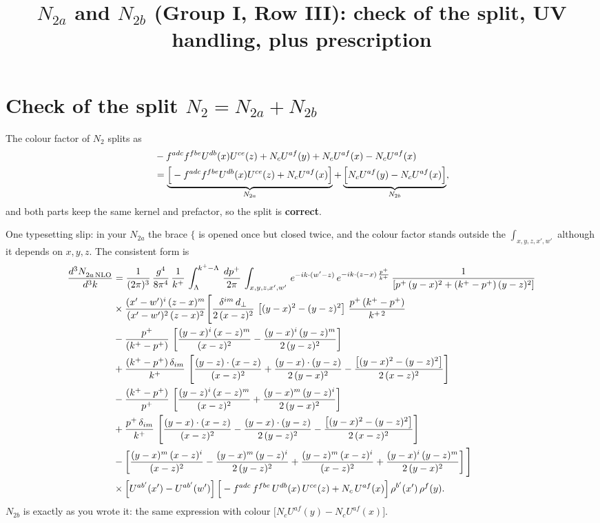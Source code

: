 \documentclass[10pt]{article}
\title{$N_{2a}$ and $N_{2b}$ (Group I, Row III): check of the split, UV handling, plus prescription}
\date{}
\numberwithin{equation}{section}
\begin{document}
\maketitle

\section{Check of the split $N_{2}=N_{2a}+N_{2b}$}
The colour factor of $N_{2}$ splits as
\begin{align}
&-f^{adc}f^{fbe}U^{db}(x)U^{ce}(z)+N_{c}U^{af}(y)+N_{c}U^{af}(x)-N_{c}U^{af}(x)\notag\\
&=\underbrace{\Big[-f^{adc}f^{fbe}U^{db}(x)U^{ce}(z)+N_{c}U^{af}(x)\Big]}_{N_{2a}}+\underbrace{\Big[N_{c}U^{af}(y)-N_{c}U^{af}(x)\Big]}_{N_{2b}},
\end{align}
and both parts keep the same kernel and prefactor, so the split is \textbf{correct}.

One typesetting slip: in your $N_{2a}$ the brace $\Bigg\{$ is opened once but closed twice, and the colour factor stands outside the $\int_{x,y,z,x',w'}$ although it depends on $x,y,z$. The consistent form is
\begin{align}
    \frac{d^{3}N_{2a\,\rm NLO}^{\rm}}{d^{3}k}  & =  \frac{1}{(2\pi)^{3}}\, \frac{g^{4}}{8\pi^{4}}\,\frac{1}{k^{+}}\,\int_{\Lambda}^{k^{+}-\Lambda}\, \frac{dp^{+}}{2\pi} \, \int_{x,y,z,x',w'}\,e^{-ik\cdot(w'-z)}\,e^{-ik\cdot (z-x)\,\frac{p^{+}}{k^{+}}}\,\frac{1}{\left[p^{+}\,(y-x)^{2}+(k^{+}-p^{+})\,(y-z)^{2}\right]} \notag \\ & \times\frac{(x'-w')^{i}\,(z-x)^{m}}{(x'-w')^{2}\,(z-x)^{2}}\Bigg[\frac{\delta^{im}\,d_{\perp}}{2\,(x-z)^{2}}\,\left[(y-x)^{2}-(y-z)^{2}\right]\,\frac{p^{+}\,(k^{+}-p^{+})}{k^{+\,2}}\notag\\ &-\frac{p^{+}}{(k^{+}-p^{+})}\,\left[\frac{(y-x)^{i}\,(x-z)^{m}}{(x-z)^{2}}-\frac{(y-x)^{i}\,(y-z)^{m}}{2\,(y-z)^{2}}\right]\notag \\ & +\frac{(k^{+}-p^{+})\,\delta_{im}}{k^{+}}\,\left[\frac{(y-z)\cdot (x-z)}{(x-z)^{2}}+\frac{(y-x)\cdot (y-z)}{2\,(y-x)^{2}}-\frac{\left[(y-x)^{2}-(y-z)^{2}\right]}{2\,(x-z)^{2}}\right]\notag\\ & -\frac{(k^{+}-p^{+})}{p^{+}}\,\left[\frac{(y-z)^{i}\,(x-z)^{m}}{(x-z)^{2}}+\frac{(y-x)^{m}\,(y-z)^{i}}{2\,(y-x)^{2}}\right]\notag \\ & +\frac{p^{+}\,\delta_{im}}{k^{+}}\,\left[\frac{(y-x)\cdot (x-z)}{(x-z)^{2}}-\frac{(y-x)\cdot (y-z)}{2\,(y-z)^{2}}-\frac{\left[(y-x)^{2}-(y-z)^{2}\right]}{2\,(x-z)^{2}}\right]\notag \\ &-\left[\frac{(y-x)^{m}\,(x-z)^{i}}{(x-z)^{2}}-\frac{(y-x)^{m}\,(y-z)^{i}}{2\,(y-z)^{2}}+\frac{(y-z)^{m}\,(x-z)^{i}}{(x-z)^{2}}+\frac{(y-x)^{i}\,(y-z)^{m}}{2\,(y-x)^{2}}\right]\Bigg]\notag \\ & \times\Big[U^{ab'}(x')-U^{ab'}(w')\Big]\,\Big[-f^{adc}\,f^{fbe}\,U^{db}(x)\,U^{ce}(z)+N_{c}\,U^{af}(x)\Big]\,\rho^{b'}(x')\,\rho^{f}(y).
\label{eq:N2a}
\end{align}
$N_{2b}$ is exactly as you wrote it: the same expression with colour $\big[N_{c}U^{af}(y)-N_{c}U^{af}(x)\big]$.
\end{document}
